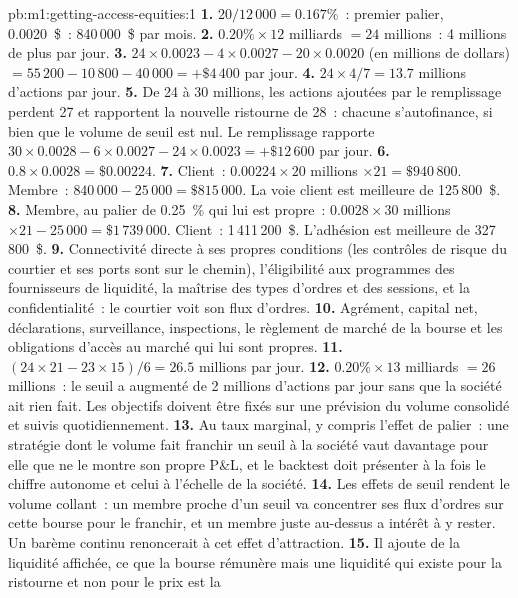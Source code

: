 \begin{solution}{pb:m1:getting-access-equities:1}
\textbf{1.} $20/12\,000 = 0.167\%$~: premier palier, 0.0020~\$~: 840\,000~\$ par mois.
\textbf{2.} $0.20\% \times 12$ milliards $= 24$ millions~: 4 millions de plus par jour.
\textbf{3.} $24 \times 0.0023 - 4 \times 0.0027 - 20 \times 0.0020$ (en millions de
dollars) $= 55\,200 - 10\,800 - 40\,000 = +\$4\,400$ par jour.
\textbf{4.} $24 \times 4/7 = 13.7$ millions d'actions par jour.
\textbf{5.} De 24 à 30 millions, les actions ajoutées par le remplissage perdent 27 et rapportent la nouvelle
ristourne de 28~: chacune s'autofinance, si bien que le volume de seuil est nul.
Le remplissage rapporte $30 \times 0.0028 - 6 \times 0.0027 - 24 \times 0.0023 = +\$12\,600$ par
jour.
\textbf{6.} $0.8 \times 0.0028 = \$0.00224$.
\textbf{7.} Client~: $0.00224 \times 20$ millions $\times 21 = \$940\,800$. Membre~:
$840\,000 - 25\,000 = \$815\,000$. La voie client est meilleure de 125\,800~\$.
\textbf{8.} Membre, au palier de 0.25~\% qui lui est propre~: $0.0028 \times 30$ millions $\times 21 -
25\,000 = \$1\,739\,000$. Client~: 1\,411\,200~\$. L'adhésion est meilleure de
327\,800~\$.
\textbf{9.} Connectivité directe à ses propres conditions (les contrôles de risque du courtier
et ses ports sont sur le chemin), l'éligibilité aux programmes des fournisseurs de liquidité,
la maîtrise des types d'ordres et des sessions, et la confidentialité~: le courtier voit
son flux d'ordres.
\textbf{10.} Agrément, capital net, déclarations, surveillance, inspections,
le règlement de marché de la bourse et les obligations d'accès au marché qui lui sont propres.
\textbf{11.} $(24 \times 21 - 23 \times 15)/6 = 26.5$ millions par jour.
\textbf{12.} $0.20\% \times 13$ milliards $= 26$ millions~: le seuil a augmenté
de 2 millions d'actions par jour sans que la société ait rien fait. Les objectifs doivent
être fixés sur une prévision du volume consolidé et suivis quotidiennement.
\textbf{13.} Au taux marginal, y compris l'effet de palier~: une stratégie dont
le volume fait franchir un seuil à la société vaut davantage pour elle que ne le montre son propre
P\&L, et le backtest doit présenter à la fois le chiffre autonome et
celui à l'échelle de la société.
\textbf{14.} Les effets de seuil rendent le volume collant~: un membre proche d'un seuil va
concentrer ses flux d'ordres sur cette bourse pour le franchir, et un membre juste au-dessus
a intérêt à y rester. Un barème continu renoncerait à cet effet d'attraction.
\textbf{15.} Il ajoute de la liquidité affichée, ce que la bourse rémunère
mais une liquidité qui existe pour la ristourne et non pour le prix est la

\end{solution}
